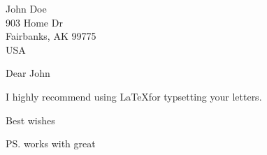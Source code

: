 \documentclass[english]{GIletter}
\begin{document}
\begin{letter}
  {John Doe \\
    903 Home Dr \\
    Fairbanks, AK 99775 \\
    USA  \\
  }
  
  \opening{Dear John}
  
  I highly recommend using \LaTeX for typsetting your letters. 

  \closing{Best wishes}
  
  
  \ps{works with great}
  
\end{letter}
\end{document}
